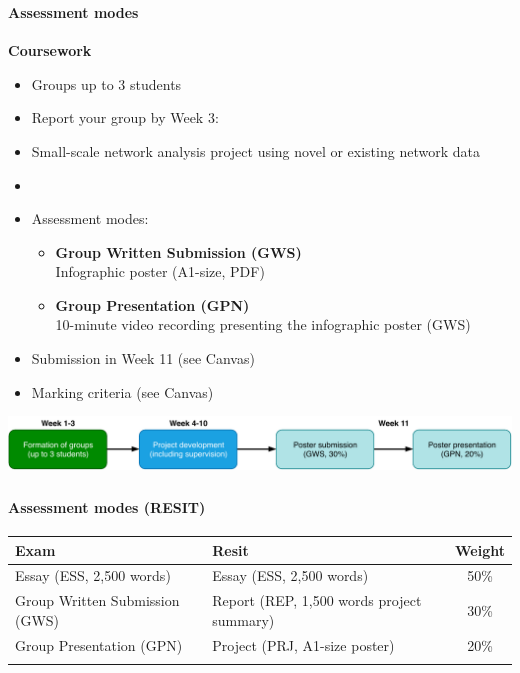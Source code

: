\documentclass[8pt]{beamer}
\begin{document}
\begin{frame}
\frametitle{\insertsection}
\framesubtitle{Assessment modes}

\textbf{Coursework}\\
\begin{itemize}
\item Groups up to 3 students
\item Report your group by Week 3: \href{https://docs.google.com/document/d/1y00FtaNSFJkJedAXjxgFTBMlYiI5xIspNkSm8PSipro/edit?usp=sharing}{}
\item Small-scale network analysis project using novel or existing network data
\item {\color{orange}{Any topic!}}
\item Assessment modes:
	\begin{itemize}
	\item \textbf{Group Written Submission (GWS)} {\color{blue}{[30\% weighting]}}\\
		 Infographic poster (A1-size, PDF)
	\item \textbf{Group Presentation (GPN)} {\color{blue}{[20\% weighting]}}\\
	10-minute video recording presenting the infographic poster (GWS)
	\end{itemize}
\item Submission in Week 11 (see Canvas)
\item Marking criteria (see Canvas)
\end{itemize}

\bigskip

\centering
\includegraphics[width=\linewidth]{flow_chart_group_work}\\

\end{frame}


\begin{frame}
\frametitle{\insertsection}
\framesubtitle{Assessment modes (RESIT)}

\centering
\def\arraystretch{1.5}
\begin{tabular}{llc}
\toprule
\textbf{Exam} & \textbf{Resit} & \textbf{Weight}\\
\hline
Essay (ESS, 2,500 words)& 
Essay (ESS, 2,500 words)& 
50\%\\

Group Written Submission (GWS) & 
Report (REP, 1,500 words project summary){\color{orange}{*}} &
30\%\\
Group Presentation (GPN) &
Project (PRJ, A1-size poster){\color{orange}{*}}&
20\%\\

\bottomrule
{\color{orange}{*Individual work}}
\end{tabular}


\end{frame}
\end{document}
